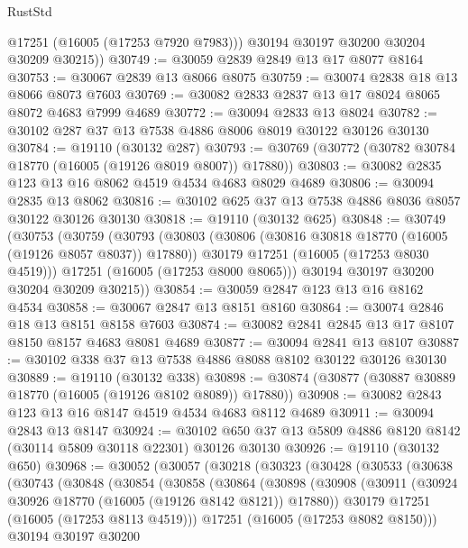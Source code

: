 \begin{lexlean}{RustStd}
\begin{coremodule}
          @17251
          (@16005 (@17253 @7920 @7983)))
        @30194
        @30197
        @30200
        @30204
        @30209
        @30215))
@30749 := @30059 @2839 @2849 @13 @17 @8077 @8164
@30753 := @30067 @2839 @13 @8066 @8075
@30759 := @30074 @2838 @18 @13 @8066 @8073 @7603
@30769 := @30082 @2833 @2837 @13 @17 @8024 @8065 @8072 @4683 @7999 @4689
@30772 := @30094 @2833 @13 @8024
@30782 := @30102 @287 @37 @13 @7538 @4886 @8006 @8019 @30122 @30126 @30130
@30784 := @19110 (@30132 @287)
@30793 := @30769 (@30772 (@30782 @30784 @18770 (@16005 (@19126 @8019 @8007)) @17880))
@30803 := @30082 @2835 @123 @13 @16 @8062 @4519 @4534 @4683 @8029 @4689
@30806 := @30094 @2835 @13 @8062
@30816 := @30102 @625 @37 @13 @7538 @4886 @8036 @8057 @30122 @30126 @30130
@30818 := @19110 (@30132 @625)
@30848 := @30749
    (@30753
      (@30759
        (@30793
          (@30803
            (@30806 (@30816 @30818 @18770 (@16005 (@19126 @8057 @8037)) @17880))
            @30179
            @17251
            (@16005 (@17253 @8030 @4519)))
          @17251
          (@16005 (@17253 @8000 @8065)))
        @30194
        @30197
        @30200
        @30204
        @30209
        @30215))
@30854 := @30059 @2847 @123 @13 @16 @8162 @4534
@30858 := @30067 @2847 @13 @8151 @8160
@30864 := @30074 @2846 @18 @13 @8151 @8158 @7603
@30874 := @30082 @2841 @2845 @13 @17 @8107 @8150 @8157 @4683 @8081 @4689
@30877 := @30094 @2841 @13 @8107
@30887 := @30102 @338 @37 @13 @7538 @4886 @8088 @8102 @30122 @30126 @30130
@30889 := @19110 (@30132 @338)
@30898 := @30874 (@30877 (@30887 @30889 @18770 (@16005 (@19126 @8102 @8089)) @17880))
@30908 := @30082 @2843 @123 @13 @16 @8147 @4519 @4534 @4683 @8112 @4689
@30911 := @30094 @2843 @13 @8147
@30924 := @30102 @650 @37 @13 @5809 @4886 @8120 @8142 (@30114 @5809 @30118 @22301) @30126 @30130
@30926 := @19110 (@30132 @650)
@30968 := @30052
    (@30057
      (@30218
        (@30323
          (@30428
            (@30533
              (@30638
                (@30743
                  (@30848
                    (@30854
                      (@30858
                        (@30864
                          (@30898
                            (@30908
                              (@30911 (@30924 @30926 @18770 (@16005 (@19126 @8142 @8121)) @17880))
                              @30179
                              @17251
                              (@16005 (@17253 @8113 @4519)))
                            @17251
                            (@16005 (@17253 @8082 @8150)))
                          @30194
                          @30197
                          @30200

\end{coremodule}
\end{lexlean}
